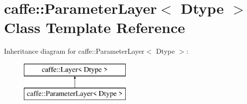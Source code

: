 \hypertarget{classcaffe_1_1ParameterLayer}{}\section{caffe\+:\+:Parameter\+Layer$<$ Dtype $>$ Class Template Reference}
\label{classcaffe_1_1ParameterLayer}
Inheritance diagram for caffe\+:\+:Parameter\+Layer$<$ Dtype $>$\+:\begin{figure}[H]
\begin{center}
\leavevmode
\includegraphics[height=2.000000cm]{classcaffe_1_1ParameterLayer}
\end{center}
\end{figure}
